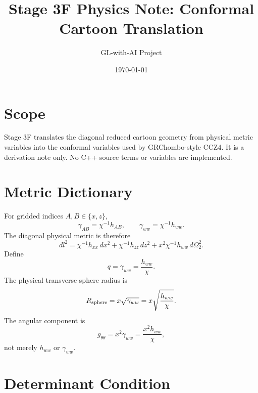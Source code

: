 \documentclass[11pt]{article}
\title{Stage 3F Physics Note: Conformal Cartoon Translation}
\author{GL-with-AI Project}
\date{\today}
\begin{document}
\maketitle

\section{Scope}

Stage 3F translates the diagonal reduced cartoon geometry from physical metric
variables into the conformal variables used by GRChombo-style CCZ4. It is a
derivation note only. No C++ source terms or variables are implemented.

\section{Metric Dictionary}

For gridded indices \(A,B\in\{x,z\}\),
\begin{equation}
  \gamma_{AB}=\chi^{-1}h_{AB},
  \qquad
  \gamma_{ww}=\chi^{-1}h_{ww}.
\end{equation}
The diagonal physical metric is therefore
\begin{equation}
  dl^2
  =
  \chi^{-1}h_{xx}\,dx^2
  +
  \chi^{-1}h_{zz}\,dz^2
  +
  x^2\chi^{-1}h_{ww}\,d\Omega_2^2.
\end{equation}
Define
\begin{equation}
  q=\gamma_{ww}=\frac{h_{ww}}{\chi}.
\end{equation}
The physical transverse sphere radius is
\begin{equation}
  R_{\rm sphere}=x\sqrt{\gamma_{ww}}
  =
  x\sqrt{\frac{h_{ww}}{\chi}}.
\end{equation}
The angular component is
\begin{equation}
  g_{\theta\theta}=x^2\gamma_{ww}
  =
  \frac{x^2h_{ww}}{\chi},
\end{equation}
not merely \(h_{ww}\) or \(\gamma_{ww}\).

\section{Determinant Condition}
\end{document}
